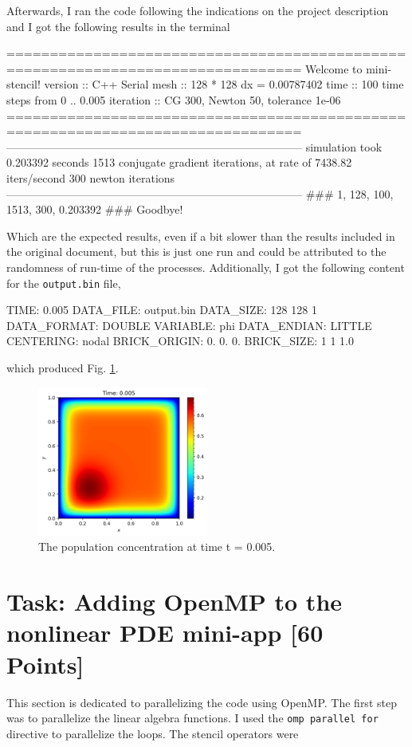 \documentclass[unicode,11pt,a4paper,oneside,numbers=endperiod,openany]{scrartcl}
\begin{document}
Afterwards, I ran the code following the indications on the project description
and I got the following results in the terminal
\begin{grayverbatim}
================================================================================
                      Welcome to mini-stencil!
version   :: C++ Serial
mesh      :: 128 * 128 dx = 0.00787402
time      :: 100 time steps from 0 .. 0.005
iteration :: CG 300, Newton 50, tolerance 1e-06
================================================================================
--------------------------------------------------------------------------------
simulation took 0.203392 seconds
1513 conjugate gradient iterations, at rate of 7438.82 iters/second
300 newton iterations
--------------------------------------------------------------------------------
### 1, 128, 100, 1513, 300, 0.203392 ###
Goodbye!
\end{grayverbatim}
Which are the expected results, even if a bit slower than the results included
in the original document, but this is just one run and could be attributed to
the randomness of run-time of the processes. Additionally, I got the following content for
the \texttt{output.bin} file,
\begin{grayverbatim}
TIME: 0.005
DATA_FILE: output.bin
DATA_SIZE: 128 128 1
DATA_FORMAT: DOUBLE
VARIABLE: phi
DATA_ENDIAN: LITTLE
CENTERING: nodal
BRICK_ORIGIN: 0. 0. 0.
BRICK_SIZE: 1 1  1.0
\end{grayverbatim}
which produced Fig. \ref{im:final_time}.
\begin{figure}[h]
    \centering
    \includegraphics[width=0.5\textwidth]{../mini_app/output.png}
    \caption{The population concentration at time t = 0.005.}
    \label{im:final_time}
\end{figure}

\section{Task:  Adding OpenMP to the nonlinear PDE mini-app [60 Points]}
This section is dedicated to parallelizing the code using OpenMP. The first step
was to parallelize the linear algebra functions. I used the \texttt{omp
parallel for} directive to parallelize the loops. The stencil operators were
\end{document}
